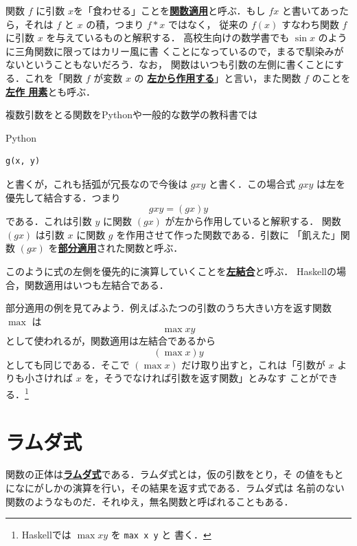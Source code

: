 \documentclass[a5paper,twoside,fleqn,draft]{jsbook}
\newcommand{\programminglanguage}[1]{\textsf{#1}}
\newcommand{\haskell}{\programminglanguage{Haskell}}
\newcommand{\python}{\programminglanguage{Python}}
\newcommand{\keyword}[1]{{\underline{\textbf{#1}}}}
\newcommand{\code}[1]{\texttt{#1}}
\newenvironment{pythoncode}{\begin{itembox}[r]{\python}}{\end{itembox}}
\newcommand{\mSpecialFunc}[1]{#1}
\DeclareMathOperator{\mMax}{\mSpecialFunc{max}}
\begin{document}

関数 $f$ に引数 $x$を「食わせる」ことを\keyword{関数適用}と呼ぶ．もし
$fx$ と書いてあったら，それは $f$ と $x$ の積，つまり $f*x$ ではなく，
従来の $f(x)$ すなわち関数 $f$ に引数 $x$ を与えているものと解釈する．
高校生向けの数学書でも $\sin x$ のように三角関数に限ってはカリー風に書
くことになっているので，まるで馴染みがないということもないだろう．なお，
関数はいつも引数の左側に書くことにする．これを「関数 $f$ が変数 $x$ の
  \keyword{左から作用する}」と言い，また関数 $f$ のことを\keyword{左作
  用素}とも呼ぶ．

複数引数をとる関数を\python や一般的な数学の教科書では
\begin{pythoncode}
\begin{verbatim}
g(x, y)
\end{verbatim}
\end{pythoncode}
と書くが，これも括弧が冗長なので今後は $gxy$ と書く．この場合式 $gxy$
は左を優先して結合する．つまり
\begin{equation}
  gxy=(gx)y
\end{equation}
である．これは引数 $y$ に関数 $(gx)$ が左から作用していると解釈する．
関数 $(gx)$ は引数 $x$ に関数 $g$ を作用させて作った関数である．引数に
「飢えた」関数 $(gx)$ を\keyword{部分適用}された関数と呼ぶ．

このように式の左側を優先的に演算していくことを\keyword{左結合}と呼ぶ．
\haskell の場合，関数適用はいつも左結合である．

部分適用の例を見てみよう．例えばふたつの引数のうち大きい方を返す関数
$\mMax$ は
\begin{equation}
  \mMax xy
\end{equation}
として使われるが，関数適用は左結合であるから
\begin{equation}
  (\mMax x)y
\end{equation}
としても同じである．そこで $(\mMax x)$ だけ取り出すと，これは「引数が
  $x$ よりも小さければ $x$ を，そうでなければ引数を返す関数」とみなす
ことができる．\footnote{\haskell では $\mMax xy$ を \code{max x y} と
  書く．}

\section{ラムダ式}

関数の正体は\keyword{ラムダ式}である．ラムダ式とは，仮の引数をとり，そ
の値をもとになにがしかの演算を行い，その結果を返す式である．ラムダ式は
名前のない関数のようなものだ．それゆえ，無名関数と呼ばれることもある．
\end{document}
